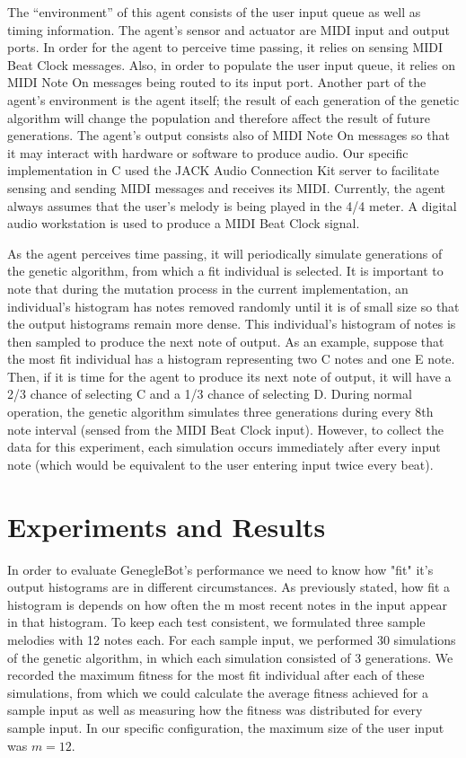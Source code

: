 \documentclass[conference]{IEEEtran}
\begin{document}
The “environment” of this agent consists of the user input queue as well as timing information. The agent’s sensor and actuator are MIDI input and output ports. In order for the agent to perceive time passing, it relies on sensing MIDI Beat Clock messages. Also, in order to populate the user input queue, it relies on MIDI Note On messages being routed to its input port. Another part of the agent’s environment is the agent itself; the result of each generation of the genetic algorithm will change the population and therefore affect the result of future generations. The agent’s output consists also of MIDI Note On messages so that it may interact with hardware or software to produce audio. Our specific implementation in C used the JACK Audio Connection Kit server to facilitate sensing and sending MIDI messages and receives its MIDI. Currently, the agent always assumes that the user’s melody is being played in the 4/4 meter. A digital audio workstation is used to produce a MIDI Beat Clock signal.

As the agent perceives time passing, it will periodically simulate generations of the genetic algorithm, from which a fit individual is selected. It is important to note that during the mutation process in the current implementation, an individual's histogram has notes removed randomly until it is of small size so that the output histograms remain more dense. This individual’s histogram of notes is then sampled to produce the next note of output. As an example, suppose that the most fit individual has a histogram representing two C notes and one E note. Then, if it is time for the agent to produce its next note of output, it will have a 2/3  chance of selecting C and a 1/3 chance of selecting D.  During normal operation, the genetic algorithm simulates three generations during every 8th note interval (sensed from the MIDI Beat Clock input). However, to collect the data for this experiment, each simulation occurs immediately after every input note (which would be equivalent to the user entering input twice every beat). 


\section{Experiments and Results}

    In order to evaluate GenegleBot's performance we need to know how "fit" it's output histograms are in different circumstances.  As previously stated, how fit a histogram is depends on how often the m most recent notes in the input appear in that histogram.  To keep each test consistent, we formulated three sample melodies with 12 notes each.  For each sample input, we performed 30 simulations of the genetic algorithm, in which each simulation consisted of 3 generations. We recorded the maximum fitness for the most fit individual after each of these simulations, from which we could calculate the average fitness achieved for a sample input as well as measuring how the fitness was distributed for every sample input. In our specific configuration, the maximum size of the user input was $ m=12 $. 
    
\end{document}
